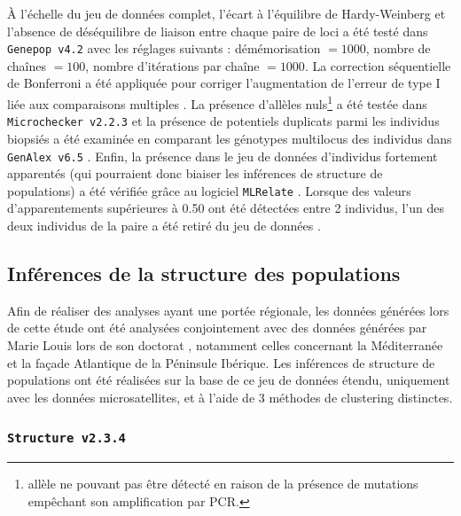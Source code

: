 \documentclass[a4paper,12pt,twoside]{article}\usepackage[]{graphicx}\usepackage[]{color}
\begin{document}
À l'échelle du jeu de données complet, l'écart à l'équilibre de Hardy-Weinberg et l'absence de déséquilibre de liaison entre chaque paire de loci a été testé dans \texttt{Genepop~v4.2} \citep{rousset2008} avec les réglages suivants : démémorisation $= 1000$, nombre de chaînes $= 100$, nombre d'itérations par chaîne $= 1000$. La correction séquentielle de Bonferroni a été appliquée pour corriger l'augmentation de l'erreur de type I liée aux comparaisons multiples \citep{holm1979}.
La présence d'allèles nuls\footnote{allèle ne pouvant pas être détecté en raison de la présence de mutations empêchant son amplification par PCR.} a été testée dans \texttt{Microchecker~v2.2.3} \citep{oosterhoot2004} et la présence de potentiels duplicats parmi les individus biopsiés a été examinée en comparant les génotypes multilocus des individus dans \texttt{GenAlex~v6.5} \citep{peakall2012}. Enfin, la présence dans le jeu de données d'individus fortement apparentés (qui pourraient donc biaiser les inférences de structure de populations) a été vérifiée grâce au logiciel \texttt{MLRelate} \citep{kalinowski2006}. Lorsque des valeurs d'apparentements supérieures à 0.50 ont été détectées entre 2 individus, l'un des deux individus de la paire a été retiré du jeu de données \citep{viricel2014}.


\subsection{Inférences de la structure des populations}

Afin de réaliser des analyses ayant une portée régionale, les données générées lors de cette étude ont été analysées conjointement avec des données générées par Marie Louis lors de son doctorat \citep{phdLouis2014}, notamment celles concernant la Méditerranée et la façade Atlantique de la Péninsule Ibérique. Les inférences de structure de populations ont été réalisées sur la base de ce jeu de données étendu, uniquement avec les données microsatellites, et à l'aide de 3 méthodes de clustering distinctes.

\subsubsection*{\texttt{Structure~v2.3.4} \citep{pritchard2000}}
\end{document}
